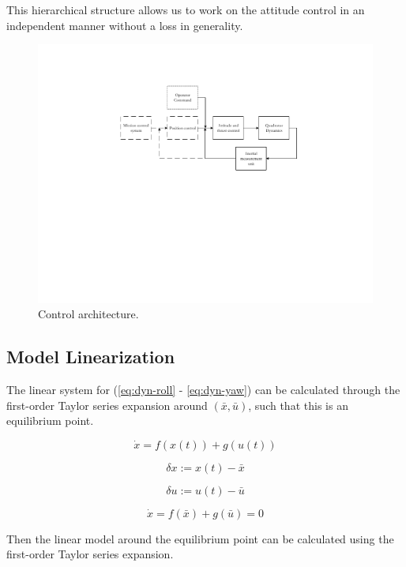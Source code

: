 \documentclass[12pt]{article}
\begin{document}
This hierarchical structure allows us to work on the attitude control in an independent manner without a loss in generality.

\begin{figure}
  \centering
  \includegraphics{control.pdf}
  \caption{Control architecture.}
  \label{fig:control}
\end{figure}

\subsection{Model Linearization}
The linear system for (\ref{eq:dyn-roll} - \ref{eq:dyn-yaw}) can be calculated through the first-order Taylor series expansion around $\left (\bar{x},\bar{u} \right )$, such that this is an equilibrium point.

\begin{equation}
\dot{x} = f(x(t)) + g(u(t))
\end{equation}

\begin{equation}
\delta x := x(t) - \bar{x}
\end{equation}

\begin{equation}
\delta u := u(t) - \bar{u}
\end{equation}

\begin{equation}
\dot{x} = f(\bar{x}) + g(\bar{u}) = 0
\end{equation}

Then the linear model around the equilibrium point can be calculated using the first-order Taylor series expansion.
\end{document}
